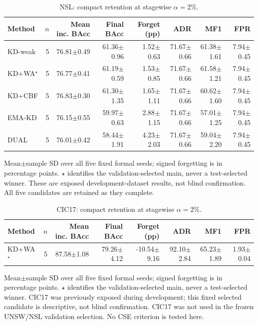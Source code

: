 \begin{table}[t]
\centering\scriptsize
\setlength{\tabcolsep}{3.3pt}
\caption{NSL: compact retention at stagewise $\alpha=2\%$.}\label{tab:compact-results-nsl_kdd}
\begin{tabular}{lrrrrrrr}
\toprule
Method & $n$ & Mean inc. BAcc & Final BAcc & Forget (pp) & ADR & MF1 & FPR \\
\midrule
KD-weak & 5 & 76.81$\pm$0.49 & 61.36$\pm$0.96 & 1.52$\pm$0.63 & 71.67$\pm$0.66 & 61.38$\pm$1.61 & 7.94$\pm$0.45 \\
KD+WA$^\star$ & 5 & 76.77$\pm$0.41 & 61.19$\pm$0.59 & 1.53$\pm$0.85 & 71.67$\pm$0.66 & 61.58$\pm$1.21 & 7.94$\pm$0.45 \\
KD+CBF & 5 & 76.83$\pm$0.30 & 61.30$\pm$1.35 & 1.65$\pm$1.11 & 71.67$\pm$0.66 & 60.62$\pm$1.60 & 7.94$\pm$0.45 \\
EMA-KD & 5 & 76.15$\pm$0.55 & 59.97$\pm$0.63 & 2.88$\pm$1.15 & 71.67$\pm$0.66 & 57.01$\pm$1.25 & 7.94$\pm$0.45 \\
DUAL & 5 & 76.01$\pm$0.42 & 58.44$\pm$1.91 & 4.23$\pm$2.03 & 71.67$\pm$0.66 & 59.04$\pm$2.20 & 7.94$\pm$0.45 \\
\bottomrule
\end{tabular}
\par\smallskip\begin{minipage}{0.98\textwidth}\scriptsize Mean$\pm$sample SD over all five fixed formal seeds; signed forgetting is in percentage points. $\star$ identifies the validation-selected main, never a test-selected winner. These are exposed development-dataset results, not blind confirmation. All five candidates are retained as they complete.\end{minipage}
\end{table}

\begin{table}[t]
\centering\scriptsize
\setlength{\tabcolsep}{3.3pt}
\caption{CIC17: compact retention at stagewise $\alpha=2\%$.}\label{tab:compact-results-cic_ids_2017}
\begin{tabular}{lrrrrrrr}
\toprule
Method & $n$ & Mean inc. BAcc & Final BAcc & Forget (pp) & ADR & MF1 & FPR \\
\midrule
KD+WA$^\star$ & 5 & 87.58$\pm$1.08 & 79.26$\pm$4.12 & -10.54$\pm$9.16 & 92.10$\pm$2.84 & 65.23$\pm$1.89 & 1.93$\pm$0.04 \\
\bottomrule
\end{tabular}
\par\smallskip\begin{minipage}{0.98\textwidth}\scriptsize Mean$\pm$sample SD over all five fixed formal seeds; signed forgetting is in percentage points. $\star$ identifies the validation-selected main, never a test-selected winner. CIC17 was previously exposed during development; this fixed selected candidate is descriptive, not blind confirmation. CIC17 was not used in the frozen UNSW/NSL validation selection. No CSE criterion is tested here.\end{minipage}
\end{table}

